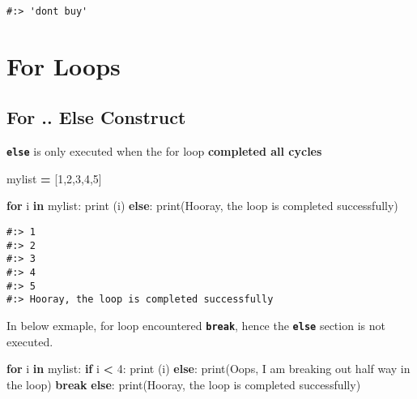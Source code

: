 \documentclass[
]{book}
\newenvironment{Shaded}{\begin{snugshade}}{\end{snugshade}}
\newcommand{\BuiltInTok}[1]{#1}
\newcommand{\ControlFlowTok}[1]{\textcolor[rgb]{0.27,0.27,0.27}{\textbf{#1}}}
\newcommand{\DecValTok}[1]{\textcolor[rgb]{0.06,0.06,0.06}{#1}}
\newcommand{\KeywordTok}[1]{\textcolor[rgb]{0.27,0.27,0.27}{\textbf{#1}}}
\newcommand{\NormalTok}[1]{#1}
\newcommand{\OperatorTok}[1]{\textcolor[rgb]{0.43,0.43,0.43}{\textbf{#1}}}
\newcommand{\StringTok}[1]{\textcolor[rgb]{0.5,0.5,0.5}{#1}}
\begin{document}
\begin{verbatim}
#:> 'dont buy'
\end{verbatim}

\hypertarget{for-loops}{%
\section{For Loops}\label{for-loops}}

\hypertarget{for-..-else-construct}{%
\subsection{For .. Else Construct}\label{for-..-else-construct}}

\textbf{\texttt{else}} is only executed when the for loop \textbf{completed all cycles}

\begin{Shaded}
\begin{Highlighting}[]

\NormalTok{mylist }\OperatorTok{=}\NormalTok{ [}\DecValTok{1}\NormalTok{,}\DecValTok{2}\NormalTok{,}\DecValTok{3}\NormalTok{,}\DecValTok{4}\NormalTok{,}\DecValTok{5}\NormalTok{]}

\ControlFlowTok{for}\NormalTok{ i }\KeywordTok{in}\NormalTok{ mylist:}
  \BuiltInTok{print}\NormalTok{ (i)}
\ControlFlowTok{else}\NormalTok{:}
  \BuiltInTok{print}\NormalTok{(}\StringTok{\textquotesingle{}Hooray, the loop is completed successfully\textquotesingle{}}\NormalTok{)}
\end{Highlighting}
\end{Shaded}

\begin{verbatim}
#:> 1
#:> 2
#:> 3
#:> 4
#:> 5
#:> Hooray, the loop is completed successfully
\end{verbatim}

In below exmaple, for loop encountered \textbf{\texttt{break}}, hence the \textbf{\texttt{else}} section is not executed.

\begin{Shaded}
\begin{Highlighting}[]
\ControlFlowTok{for}\NormalTok{ i }\KeywordTok{in}\NormalTok{ mylist:}
  \ControlFlowTok{if}\NormalTok{ i }\OperatorTok{\textless{}} \DecValTok{4}\NormalTok{:}
    \BuiltInTok{print}\NormalTok{ (i)}
  \ControlFlowTok{else}\NormalTok{:}
    \BuiltInTok{print}\NormalTok{(}\StringTok{\textquotesingle{}Oops, I am breaking out half way in the loop\textquotesingle{}}\NormalTok{)}
    \ControlFlowTok{break}
\ControlFlowTok{else}\NormalTok{:}
  \BuiltInTok{print}\NormalTok{(}\StringTok{\textquotesingle{}Hooray, the loop is completed successfully\textquotesingle{}}\NormalTok{)}
\end{Highlighting}
\end{Shaded}
\end{document}
